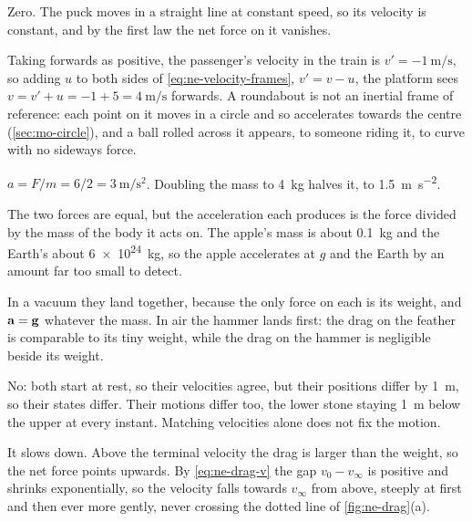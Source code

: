 \label{sec:ne-answers}

Zero. The puck moves in a straight line
at constant speed, so its velocity is constant, and by the first law the
net force on it vanishes.

Taking forwards as positive, the
passenger's velocity in the train is $v' = \SI{-1}{\metre\per\second}$,
so adding $u$ to both sides of \cref{eq:ne-velocity-frames}, $v' = v -
u$, the platform sees $v = v' + u = -1 + 5 = \SI{4}{\metre\per\second}$
forwards. A roundabout is not an inertial
frame of reference: each point on it moves in a circle and so accelerates
towards the centre (\cref{sec:mo-circle}), and a ball rolled across it
appears, to someone riding it, to curve with no sideways force.

$a = F/m = 6/2 =
\SI{3}{\metre\per\second\squared}$. Doubling the mass to
\SI{4}{\kilogram} halves it, to \SI{1.5}{\metre\per\second\squared}.

The two forces are equal, but the
acceleration each produces is the force divided by the mass of the body
it acts on. The apple's mass is about \SI{0.1}{\kilogram} and the Earth's
about \SI{6e24}{\kilogram}, so the apple accelerates at $g$ and the Earth
by an amount far too small to detect.

In a vacuum they land together,
because the only force on each is its weight, and $\bm{\mathrm{a}} = \bm{\mathrm{g}}$
whatever the mass. In air the hammer lands first: the drag on the feather
is comparable to its tiny weight, while the drag on the hammer is
negligible beside its weight.

No: both start at rest, so their
velocities agree, but their positions differ by \SI{1}{\metre}, so their
states differ. Their motions differ too, the lower stone staying
\SI{1}{\metre} below the upper at every instant. Matching velocities
alone does not fix the motion.

It slows down. Above the terminal
velocity the drag is larger than the weight, so the net force points
upwards. By \cref{eq:ne-drag-v} the gap $v_0 - v_\infty$ is positive and
shrinks exponentially, so the velocity falls towards $v_\infty$ from
above, steeply at first and then ever more gently, never crossing the
dotted line of \cref{fig:ne-drag}(a).

